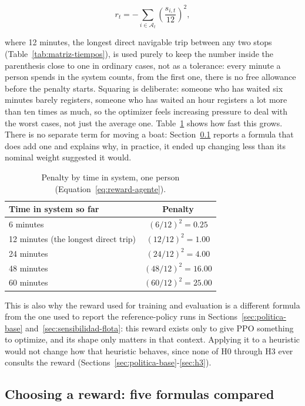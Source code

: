 \documentclass[11pt,a4paper]{article}
\begin{document}
\begin{equation}
r_t = -\sum_{i \in \mathcal{A}_t} \left(\frac{s_{i,t}}{12}\right)^{2},
\label{eq:reward-agente}
\end{equation}

where 12 minutes, the longest direct navigable trip between any two stops (Table~\ref{tab:matriz-tiempos}), is used purely to keep the number inside the parenthesis close to one in ordinary cases, not as a tolerance: every minute a person spends in the system counts, from the first one, there is no free allowance before the penalty starts. Squaring is deliberate: someone who has waited six minutes barely registers, someone who has waited an hour registers a lot more than ten times as much, so the optimizer feels increasing pressure to deal with the worst cases, not just the average one. Table~\ref{tab:reward-magnitudes} shows how fast this grows. There is no separate term for moving a boat: Section~\ref{sec:prueba-rewards} reports a formula that does add one and explains why, in practice, it ended up changing less than its nominal weight suggested it would.

\begin{table}[H]
\centering
\caption{Penalty by time in system, one person (Equation~\ref{eq:reward-agente}).}
\label{tab:reward-magnitudes}
\small
\begin{tabular}{lc}
\toprule
Time in system so far & Penalty \\
\midrule
6 minutes & $(6/12)^2 = 0.25$ \\
12 minutes (the longest direct trip) & $(12/12)^2 = 1.00$ \\
24 minutes & $(24/12)^2 = 4.00$ \\
48 minutes & $(48/12)^2 = 16.00$ \\
60 minutes & $(60/12)^2 = 25.00$ \\
\bottomrule
\end{tabular}
\end{table}

This is also why the reward used for training and evaluation is a different formula from the one used to report the reference-policy runs in Sections~\ref{sec:politica-base} and~\ref{sec:sensibilidad-flota}: this reward exists only to give PPO something to optimize, and its shape only matters in that context. Applying it to a heuristic would not change how that heuristic behaves, since none of H0 through H3 ever consults the reward (Sections~\ref{sec:politica-base}-\ref{sec:h3}).

\subsection{Choosing a reward: five formulas compared}
\label{sec:prueba-rewards}
\end{document}
